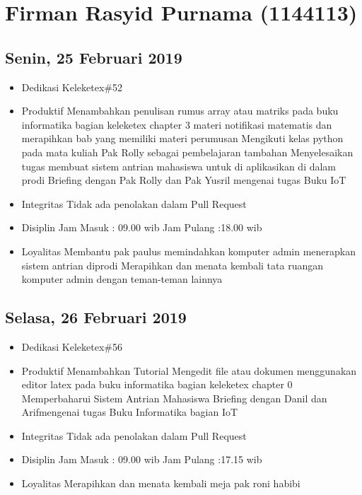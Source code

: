 \chapter{Firman Rasyid Purnama (1144113)}

\section{Senin, 25 Februari 2019}
\begin{itemize}
\item Dedikasi
\subitem Keleketex\#52
\item Produktif
  \subitem Menambahkan penulisan rumus array atau matriks pada buku informatika bagian keleketex chapter 3 materi notifikasi matematis dan merapihkan bab yang memiliki materi perumusan
  \subitem Mengikuti kelas python pada mata kuliah Pak Rolly sebagai pembelajaran tambahan
  \subitem Menyelesaikan tugas membuat sistem antrian mahasiswa untuk di aplikasikan di dalam prodi
  \subitem Briefing dengan Pak Rolly dan Pak Yusril mengenai tugas Buku IoT
\item Integritas
  \subitem Tidak ada penolakan dalam Pull Request
\item Disiplin
  \subitem Jam Masuk : 09.00 wib
  \subitem Jam Pulang :18.00 wib
\item Loyalitas
  \subitem Membantu pak paulus memindahkan komputer admin menerapkan sistem antrian diprodi
  \subitem Merapihkan dan menata kembali tata ruangan komputer admin dengan teman-teman lainnya
\end{itemize}

\section{Selasa, 26 Februari 2019}
\begin{itemize}
\item Dedikasi
  \subitem Keleketex\#56
\item Produktif
  \subitem Menambahkan Tutorial Mengedit file atau dokumen menggunakan editor latex pada buku informatika bagian keleketex chapter 0
  \subitem Memperbaharui Sistem Antrian Mahasiswa
  \subitem Briefing dengan Danil dan Arifmengenai tugas Buku Informatika bagian IoT
\item Integritas
  \subitem Tidak ada penolakan dalam Pull Request
\item Disiplin
  \subitem Jam Masuk : 09.00 wib
  \subitem Jam Pulang :17.15 wib
\item Loyalitas
  \subitem Merapihkan dan menata kembali meja pak roni habibi
\end{itemize}


